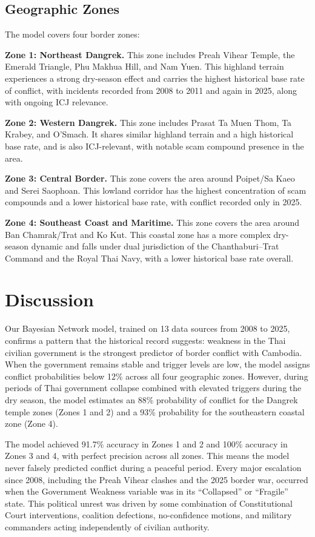 \documentclass[12pt]{article}
\begin{document}
\subsection*{Geographic Zones}

The model covers four border zones:

\textbf{Zone 1: Northeast Dangrek.} This zone includes Preah Vihear Temple, the Emerald Triangle, Phu Makhua Hill, and Nam Yuen. This highland terrain experiences a strong dry-season effect and carries the highest historical base rate of conflict, with incidents recorded from 2008 to 2011 and again in 2025, along with ongoing ICJ relevance.

\textbf{Zone 2: Western Dangrek.} This zone includes Prasat Ta Muen Thom, Ta Krabey, and O'Smach. It shares similar highland terrain and a high historical base rate, and is also ICJ-relevant, with notable scam compound presence in the area.

\textbf{Zone 3: Central Border.} This zone covers the area around Poipet/Sa Kaeo and Serei Saophoan. This lowland corridor has the highest concentration of scam compounds and a lower historical base rate, with conflict recorded only in 2025.

\textbf{Zone 4: Southeast Coast and Maritime.} This zone covers the area around Ban Chamrak/Trat and Ko Kut. This coastal zone has a more complex dry-season dynamic and falls under dual jurisdiction of the Chanthaburi--Trat Command and the Royal Thai Navy, with a lower historical base rate overall.

\section*{Discussion}

Our Bayesian Network model, trained on 13 data sources from 2008 to 2025, confirms a pattern that the historical record suggests: weakness in the Thai civilian government is the strongest predictor of border conflict with Cambodia. When the government remains stable and trigger levels are low, the model assigns conflict probabilities below 12\% across all four geographic zones. However, during periods of Thai government collapse combined with elevated triggers during the dry season, the model estimates an 88\% probability of conflict for the Dangrek temple zones (Zones 1 and 2) and a 93\% probability for the southeastern coastal zone (Zone 4).

The model achieved 91.7\% accuracy in Zones 1 and 2 and 100\% accuracy in Zones 3 and 4, with perfect precision across all zones. This means the model never falsely predicted conflict during a peaceful period. Every major escalation since 2008, including the Preah Vihear clashes and the 2025 border war, occurred when the Government Weakness variable was in its ``Collapsed'' or ``Fragile'' state. This political unrest was driven by some combination of Constitutional Court interventions, coalition defections, no-confidence motions, and military commanders acting independently of civilian authority.
\end{document}
